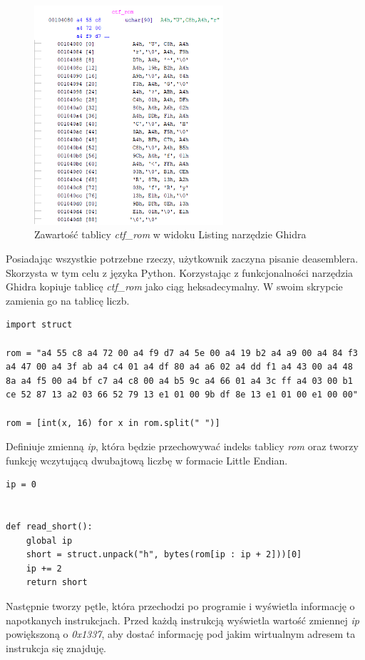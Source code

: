 \documentclass[language=polish,type=eng]{aghmodern}
\begin{document}
\begin{figure}[H]
\centering
\includegraphics[width=7cm]{600_rom}
\caption{Zawartość tablicy \emph{ctf\_rom} w widoku Listing narzędzie Ghidra}
\end{figure}

Posiadając wszystkie potrzebne rzeczy, użytkownik zaczyna pisanie deasemblera.
Skorzysta w tym celu z języka Python. Korzystając z funkcjonalności narzędzia Ghidra
kopiuje tablicę \emph{ctf\_rom} jako ciąg heksadecymalny. W swoim skrypcie
zamienia go na tablicę liczb.

\begin{verbatim}
import struct

rom = "a4 55 c8 a4 72 00 a4 f9 d7 a4 5e 00 a4 19 b2 a4 a9 00 a4 84 f3 a4 47 00 a4 3f ab a4 c4 01 a4 df 80 a4 a6 02 a4 dd f1 a4 43 00 a4 48 8a a4 f5 00 a4 bf c7 a4 c8 00 a4 b5 9c a4 66 01 a4 3c ff a4 03 00 b1 ce 52 87 13 a2 03 66 52 79 13 e1 01 00 9b df 8e 13 e1 01 00 e1 00 00"

rom = [int(x, 16) for x in rom.split(" ")]
\end{verbatim}

Definiuje zmienną \emph{ip}, która będzie przechowywać indeks tablicy \emph{rom} oraz tworzy
funkcję wczytującą dwubajtową liczbę w formacie Little Endian.

\begin{verbatim}
ip = 0


def read_short():
    global ip
    short = struct.unpack("h", bytes(rom[ip : ip + 2]))[0]
    ip += 2
    return short
\end{verbatim}

Następnie tworzy pętle, która przechodzi po programie i wyświetla informację o napotkanych instrukcjach.
Przed każdą instrukcją wyświetla wartość zmiennej \emph{ip} powiększoną o \emph{0x1337}, aby dostać
informację pod jakim wirtualnym adresem ta instrukcja się znajduję.
\end{document}
